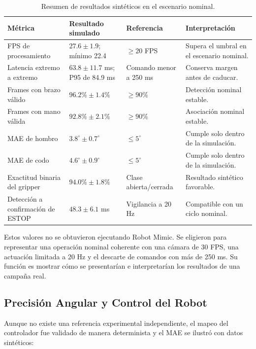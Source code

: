 \begin{table}[H]
    \centering
    \renewcommand{\arraystretch}{1.2}
    \small
    \begin{tabularx}{\textwidth}{X p{3.2cm} p{2.8cm} X}
        \toprule
        \textbf{Métrica} & \textbf{Resultado simulado} &
        \textbf{Referencia} & \textbf{Interpretación} \\
        \midrule
        FPS de procesamiento & $27.6\pm1.9$; mínimo 22.4 &
        $\geq20$ FPS & Supera el umbral en el escenario nominal. \\
        Latencia extremo a extremo & $63.8\pm11.7$ ms; P95 de 84.9 ms &
        Comando menor a 250 ms & Conserva margen antes de caducar. \\
        Frames con brazo válido & $96.2\%\pm1.4\%$ &
        $\geq90\%$ & Detección nominal estable. \\
        Frames con mano válida & $92.8\%\pm2.1\%$ &
        $\geq90\%$ & Asociación nominal estable. \\
        MAE de hombro & $3.8^\circ\pm0.7^\circ$ &
        $\leq5^\circ$ & Cumple solo dentro de la simulación. \\
        MAE de codo & $4.6^\circ\pm0.9^\circ$ &
        $\leq5^\circ$ & Cumple solo dentro de la simulación. \\
        Exactitud binaria del gripper & $94.0\%\pm1.8\%$ &
        Clase abierta/cerrada & Resultado sintético favorable. \\
        Detección a confirmación de ESTOP & $48.3\pm6.1$ ms &
        Vigilancia a 20 Hz & Compatible con un ciclo nominal. \\
        \bottomrule
    \end{tabularx}
    \caption{Resumen de resultados sintéticos en el escenario nominal.}
    \label{tab:resumen_simulado}
\end{table}

Estos valores no se obtuvieron ejecutando Robot Mimic. Se eligieron para
representar una operación nominal coherente con una cámara de 30 FPS, una
actuación limitada a 20 Hz y el descarte de comandos con más de 250 ms. Su
función es mostrar cómo se presentarían e interpretarían los resultados de una
campaña real.

\subsection{Precisión Angular y Control del Robot}
\label{subsec:precision_angular}

Aunque no existe una referencia experimental independiente, el mapeo del
controlador fue validado de manera determinista y el MAE se ilustró con datos
sintéticos:

